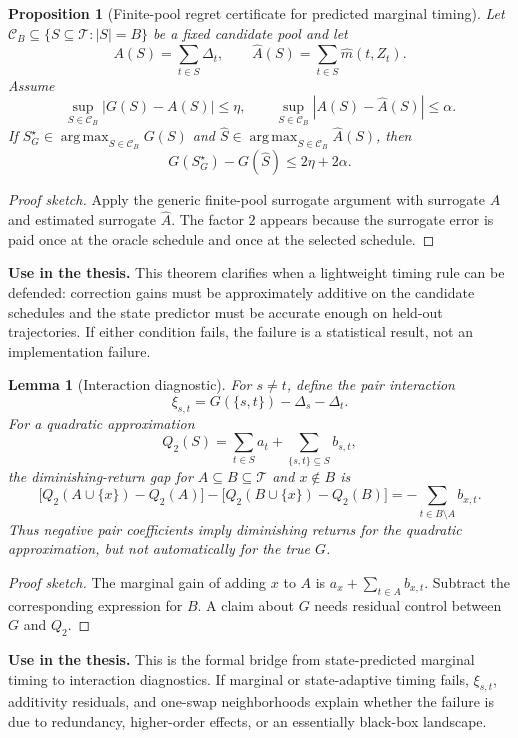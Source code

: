 \documentclass[11pt]{article}
\newcommand{\Tset}{\mathcal T}
\newcommand{\CB}{\mathcal C_B}
\newcommand{\argmax}{\operatorname*{arg\,max}}
\newtheorem{proposition}{Proposition}
\newtheorem{lemma}{Lemma}
\begin{document}
\begin{proposition}[Finite-pool regret certificate for predicted marginal timing]
Let \(\CB\subseteq\{S\subseteq\Tset: |S|=B\}\) be a fixed candidate pool and
let
\[
A(S)=\sum_{t\in S}\Delta_t,\qquad
\widehat A(S)=\sum_{t\in S}\widehat m(t,Z_t).
\]
Assume
\[
\sup_{S\in\CB}|G(S)-A(S)|\le \eta,
\qquad
\sup_{S\in\CB}|A(S)-\widehat A(S)|\le \alpha.
\]
If \(S_G^\star\in\argmax_{S\in\CB}G(S)\) and
\(\widehat S\in\argmax_{S\in\CB}\widehat A(S)\), then
\[
G(S_G^\star)-G(\widehat S)\le 2\eta+2\alpha .
\]
\end{proposition}

\begin{proof}[Proof sketch]
Apply the generic finite-pool surrogate argument with surrogate \(A\) and
estimated surrogate \(\widehat A\).  The factor \(2\) appears because the
surrogate error is paid once at the oracle schedule and once at the selected
schedule.
\end{proof}

\noindent
\textbf{Use in the thesis.}  This theorem clarifies when a lightweight timing
rule can be defended: correction gains must be approximately additive on the
candidate schedules and the state predictor must be accurate enough on
held-out trajectories.  If either condition fails, the failure is a
statistical result, not an implementation failure.

\begin{lemma}[Interaction diagnostic]
For \(s\neq t\), define the pair interaction
\[
\xi_{s,t}=G(\{s,t\})-\Delta_s-\Delta_t .
\]
For a quadratic approximation
\[
Q_2(S)=\sum_{t\in S}a_t+\sum_{\{s,t\}\subseteq S}b_{s,t},
\]
the diminishing-return gap for \(A\subseteq B\subseteq\Tset\) and
\(x\notin B\) is
\[
\bigl[Q_2(A\cup\{x\})-Q_2(A)\bigr]
-
\bigl[Q_2(B\cup\{x\})-Q_2(B)\bigr]
=-\sum_{t\in B\setminus A}b_{x,t}.
\]
Thus negative pair coefficients imply diminishing returns for the quadratic
approximation, but not automatically for the true \(G\).
\end{lemma}

\begin{proof}[Proof sketch]
The marginal gain of adding \(x\) to \(A\) is
\(a_x+\sum_{t\in A}b_{x,t}\).  Subtract the corresponding expression for
\(B\).  A claim about \(G\) needs residual control between \(G\) and \(Q_2\).
\end{proof}

\noindent
\textbf{Use in the thesis.}  This is the formal bridge from state-predicted
marginal timing to interaction diagnostics.  If marginal or state-adaptive
timing fails, \(\xi_{s,t}\), additivity residuals, and one-swap neighborhoods
explain whether the failure is due to redundancy, higher-order effects, or an
essentially black-box landscape.
\end{document}
